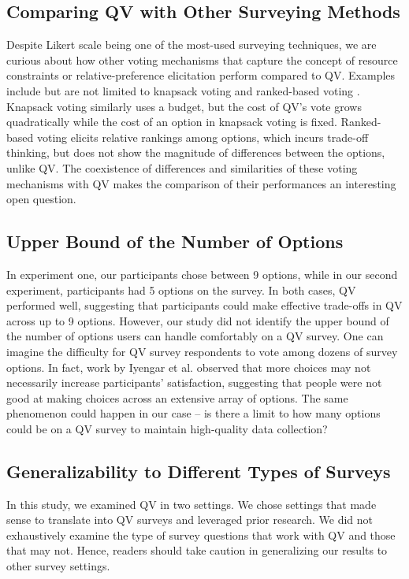 \subsection{Comparing QV with Other Surveying Methods}
Despite Likert scale being one of the most-used surveying techniques, we are curious about how other voting mechanisms that capture the concept of resource constraints or relative-preference elicitation perform compared to QV. Examples include but are not limited to knapsack voting \cite{goel2015knapsack} and ranked-based voting \cite{ledo2018evaluation}. Knapsack voting similarly uses a budget, but the cost of QV's vote grows quadratically while the cost of an option in knapsack voting is fixed. Ranked-based voting elicits relative rankings among options, which incurs trade-off thinking, but does not show the magnitude of differences between the options, unlike QV. The coexistence of differences and similarities of these voting mechanisms with QV makes the comparison of their performances an interesting open question.

\subsection{Upper Bound of the Number of Options}

In experiment one, our participants chose between 9 options, while in our second experiment, participants had 5 options on the survey. In both cases, QV performed well, suggesting that participants could make effective trade-offs in QV across up to 9 options. However, our study did not identify the upper bound of the number of options users can handle comfortably on a QV survey. One can imagine the difficulty for QV survey respondents to vote among dozens of survey options. In fact, work by Iyengar et al. \cite{iyengar2000choice} observed that more choices may not necessarily increase participants' satisfaction, suggesting that people were not good at making choices across an extensive array of options. The same phenomenon could happen in our case -- is there a limit to how many options could be on a QV survey to maintain high-quality data collection?

\subsection{Generalizability to Different Types of Surveys}
In this study, we examined QV in two settings. We chose settings that made sense to translate into QV surveys and leveraged prior research. We did not exhaustively examine the type of survey questions that work with QV and those that may not. Hence, readers should take caution in generalizing our results to other survey settings.

